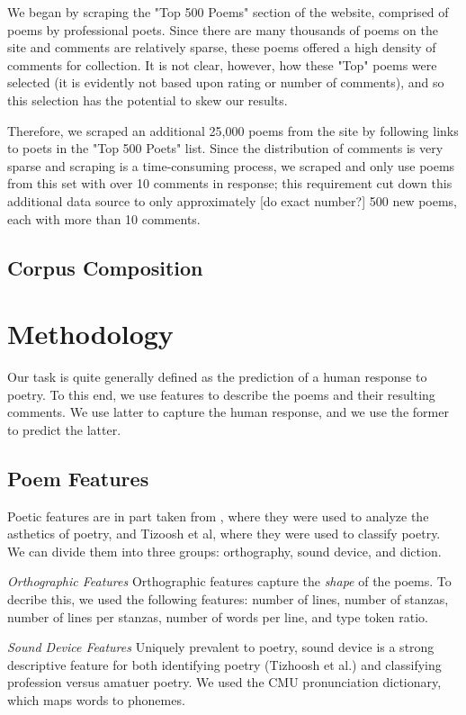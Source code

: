 \documentclass[11pt]{article}
\begin{document}
We began by scraping the "Top 500 Poems" section of the website, comprised of poems by professional poets. Since there are many thousands of poems on the site and comments are relatively sparse, these poems offered a high density of comments for collection. It is not clear, however, how these "Top" poems were selected (it is evidently not based upon rating or number of comments), and so this selection has the potential to skew our results.

Therefore, we scraped an additional 25,000 poems from the site by following links to poets in the "Top 500 Poets" list. Since the distribution of comments is very sparse and scraping is a time-consuming process, we scraped and only use poems from this set with over 10 comments in response; this requirement cut down this additional data source to only approximately [do exact number?] 500 new poems, each with more than 10 comments.

\subsection*{Corpus Composition}

\section{Methodology}
Our task is quite generally defined as the prediction of a human response to poetry. To this end, we use features to describe the poems and their resulting comments. We use latter to capture the human response, and we use the former to predict the latter.

\subsection*{Poem Features}
Poetic features are in part taken from , where they were used to analyze the asthetics of poetry, and Tizoosh et al, where they were used to classify poetry. We can divide them into three groups: orthography, sound device, and diction.

\emph{Orthographic Features}
Orthographic features capture the \emph{shape} of the poems. To decribe this, we used the following features: number of lines, number of stanzas, number of lines per stanzas, number of words per line, and type token ratio.

\emph{Sound Device Features}
Uniquely prevalent to poetry, sound device is a strong descriptive feature for both identifying poetry (Tizhoosh et al.) and classifying profession versus amatuer poetry. We used the CMU pronunciation dictionary, which maps words to phonemes.
\end{document}
